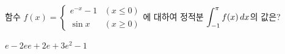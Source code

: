 함수 $f(x)=\begin{cases} e^{-x}-1 & (x\le 0) \\ \sin x & (x\ge 0) \end{cases}$에 대하여 정적분 $\displaystyle\int_{-1}^{\pi}f(x)\mkern3mu dx$의 값은?
\begin{choices32}{$e-2$}{$e$}{$e+2$}{$e+3$}{$e^2-1$}\end{choices32}
